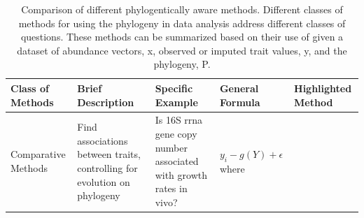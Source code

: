 \begin{table}[!ht]
        \caption[Comparison of different phylogentically aware methods.]{Comparison of different phylogentically aware methods. Different classes of methods for using the phylogeny in data analysis address different classes of questions. These methods can be summarized based on their use of given a dataset of abundance vectors, x, observed or imputed trait values, y, and the phylogeny, P. }

        \vspace{-0.25in}
        \begin{center}
                \begin{tabular}{|p{0.7in}|p{1.3in}|p{1.1in}|p{1.1in}|p{1.1in}|}
                        \hline
                        Class of Methods & Brief Description & Specific Example & General Formula & Highlighted Method \\
                        \hline
                        Comparative Methods &Find associations between traits, controlling for evolution on phylogeny & Is 16S \gls{rrna} gene copy number associated with growth rates in	vivo?& $y_{i}-g(Y)+\epsilon $
                        where


\end{tabular}
\end{center}
\end{table}
